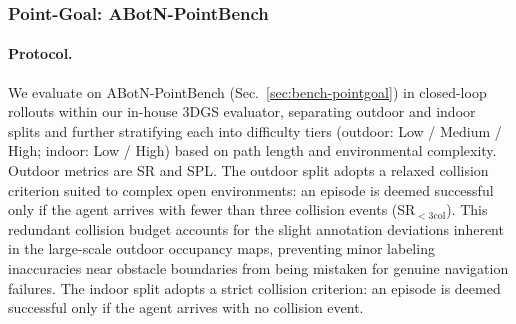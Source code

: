 \FloatBarrier
\subsubsection{Point-Goal: ABotN-PointBench}
\label{sec:exp-pointgoal}

\paragraph{Protocol.}
We evaluate on ABotN-PointBench (Sec.~\ref{sec:bench-pointgoal}) in closed-loop rollouts within our in-house 3DGS evaluator, separating outdoor and indoor splits and further stratifying each into difficulty tiers (outdoor: Low / Medium / High; indoor: Low / High) based on path length and environmental complexity. Outdoor metrics are SR and SPL. The outdoor split adopts a relaxed collision criterion suited to complex open environments: an episode is deemed successful only if the agent arrives with fewer than three collision events (SR$_{<3\text{col}}$). This redundant collision budget accounts for the slight annotation deviations inherent in the large-scale outdoor occupancy maps, preventing minor labeling inaccuracies near obstacle boundaries from being mistaken for genuine navigation failures. The indoor split adopts a strict collision criterion: an episode is deemed successful only if the agent arrives with no collision event.

